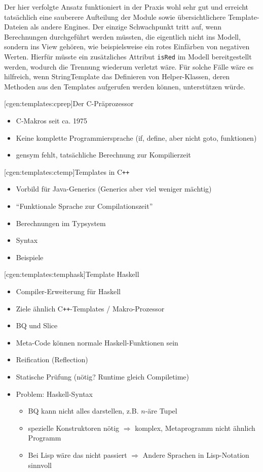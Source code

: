 \documentclass[a4paper, bibgerm]{book}
\newcommand\icode[1]{\lstinline?#1?}
\newcommand\lsubsection{}
\newcommand{\cpp}{C\texttt{++}}
\begin{document}
Der hier verfolgte Ansatz funktioniert in der Praxis wohl sehr gut und
erreicht tatsächlich eine sauberere Aufteilung der Module sowie
übersichtlichere Template-Dateien als andere Engines. Der einzige
Schwachpunkt tritt auf, wenn Berechnungen durchgeführt werden müssten,
die eigentlich nicht ins Modell, sondern ins View gehören, wie
beispielsweise ein rotes Einfärben von negativen Werten. Hierfür müsste
ein zusätzliches Attribut \icode{isRed} im Modell bereitgestellt werden,
wodurch die Trennung wiederum verletzt wäre. Für solche Fälle wäre es
hilfreich, wenn StringTemplate das Definieren von Helper-Klassen, deren
Methoden aus den Templates aufgerufen werden können, unterstützen würde.

\lsubsection[cgen:templates:cprep]{Der C-Präprozessor}
\begin{itemize}
\item C-Makros seit ca. 1975
\item Keine komplette Programmiersprache (if, define, aber nicht goto, funktionen)
\item gensym fehlt, tatsächliche Berechnung zur Kompilierzeit
\end{itemize}

\lsubsection[cgen:templates:ctemp]{Templates in \cpp{}}

\begin{itemize}
\item Vorbild für Java-Generics (Generics aber viel weniger mächtig)
\item "`Funktionale Sprache zur Compilationszeit"'
\item Berechnungen im Typsystem
\item Syntax
\item Beispiele
\end{itemize}

\lsubsection[cgen:templates:temphask]{Template Haskell}

\begin{itemize}
\item Compiler-Erweiterung für Haskell
\item Ziele ähnlich \cpp{}-Templates / Makro-Prozessor
\item BQ und Slice
\item Meta-Code können normale Haskell-Funktionen sein
\item Reification (Reflection)
\item Statische Prüfung (nötig? Runtime gleich Compiletime)
\item Problem: Haskell-Syntax
  \begin{itemize}
  \item BQ kann nicht alles darstellen, z.B. $n$-äre Tupel
  \item spezielle Konstruktoren nötig $\Rightarrow$ komplex, Metaprogramm
    nicht ähnlich Programm
  \item Bei Lisp wäre das nicht passiert $\Rightarrow$ Andere Sprachen
    in Lisp-Notation sinnvoll
  \end{itemize}
\end{itemize}
\end{document}
